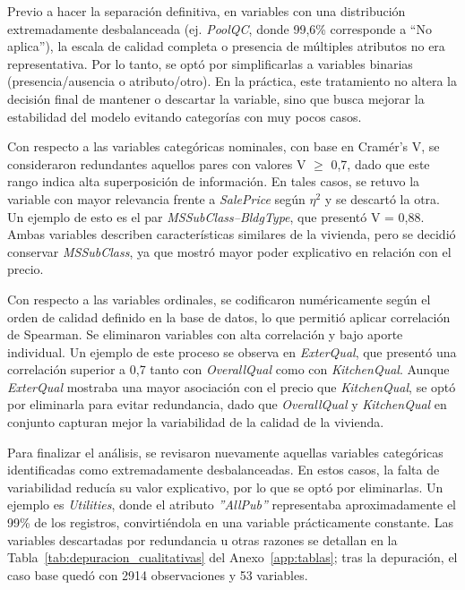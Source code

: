 Previo a hacer la separación definitiva, en variables con una distribución extremadamente desbalanceada (ej. \textit{PoolQC}, donde 99,6\% corresponde a “No aplica”), la escala de calidad completa o presencia de múltiples atributos no era representativa. Por lo tanto, se optó por simplificarlas a variables binarias (presencia/ausencia o atributo/otro). En la práctica, este tratamiento no altera la decisión final de mantener o descartar la variable, sino que busca mejorar la estabilidad del modelo evitando categorías con muy pocos casos. 

Con respecto a las variables categóricas nominales, con base en Cramér’s V, se consideraron redundantes aquellos pares con valores V $\geq$ 0,7, dado que este rango indica alta superposición de información. En tales casos, se retuvo la variable con mayor relevancia frente a \textit{SalePrice} según $\eta^{2}$ y se descartó la otra. Un ejemplo de esto es el par \textit{MSSubClass–BldgType}, que presentó V = 0,88. Ambas variables describen características similares de la vivienda, pero se decidió conservar \textit{MSSubClass}, ya que mostró mayor poder explicativo en relación con el precio. 

Con respecto a las variables ordinales, se codificaron numéricamente según el orden de calidad definido en la base de datos, lo que permitió aplicar correlación de Spearman. Se eliminaron variables con alta correlación y bajo aporte individual. Un ejemplo de este proceso se observa en \textit{ExterQual}, que presentó una correlación superior a 0,7 tanto con \textit{OverallQual} como con \textit{KitchenQual}. Aunque \textit{ExterQual} mostraba una mayor asociación con el precio que \textit{KitchenQual}, se optó por eliminarla para evitar redundancia, dado que \textit{OverallQual} y \textit{KitchenQual} en conjunto capturan mejor la variabilidad de la calidad de la vivienda.  

Para finalizar el análisis, se revisaron nuevamente aquellas variables categóricas identificadas como extremadamente desbalanceadas. En estos casos, la falta de variabilidad reducía su valor explicativo, por lo que se optó por eliminarlas. Un ejemplo es \textit{Utilities}, donde el atributo \textit{''AllPub''} representaba aproximadamente el 99\% de los registros, convirtiéndola en una variable prácticamente constante. Las variables descartadas por redundancia u otras razones se detallan en la Tabla~\ref{tab:depuracion_cualitativas} del Anexo~\ref{app:tablas}; tras la depuración, el caso base quedó con 2914 observaciones y 53 variables. 

